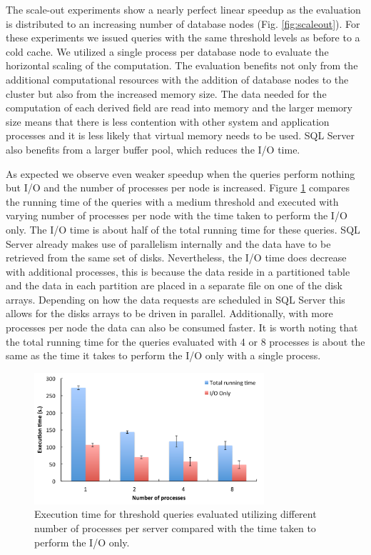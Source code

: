 \documentclass{sig-alternate}
\begin{document}
The scale-out experiments show a nearly perfect linear speedup as the evaluation is distributed to an increasing number of database nodes 
(Fig. \ref{fig:scaleout}). For these experiments we issued queries with the same threshold levels as before to a cold cache. We utilized a single process per
database node to evaluate the horizontal scaling of the computation. The evaluation benefits not only from the additional computational resources with
the addition of database nodes to the cluster but also from the increased memory size. The data needed for the computation of each derived field are
read into memory and the larger memory size means that there is less contention with other system and application processes and it is less likely that
virtual memory needs to be used. SQL Server also benefits from a larger buffer pool, which reduces the I/O time.

As expected we observe even weaker speedup when the queries perform nothing but I/O and the number of processes per node is increased.
Figure \ref{fig:io_comparison} compares the running time of the queries with a medium threshold and executed with varying number of processes per 
node with
the time taken to perform the I/O only. The I/O time is about half of the total running time for these queries. SQL Server already makes use of parallelism
internally and the data have to be retrieved from the same set of disks. Nevertheless, the I/O time does decrease with additional processes, this is because
the data reside in a partitioned table and the data in each partition are placed in a separate file on one of the disk arrays. Depending on how the data
requests are scheduled in SQL Server this allows for the disks arrays to be driven in parallel. Additionally, with more processes per node the data can
also be consumed faster. It is worth noting that the total running time for the queries evaluated with 4 or 8
processes is about the same as the time it takes to perform the I/O only with a single process.

\begin{figure}
\centering
\includegraphics[width=3.35in]{Figures/io_comparison.pdf}
\caption{Execution time for threshold queries evaluated utilizing different number of
processes per server compared with the time taken to perform the I/O only.}
\label{fig:io_comparison}
\end{figure}
\end{document}
